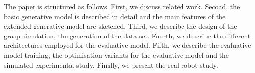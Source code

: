 
The paper is structured as follows. First, we discuss related work. Second, the basic generative model is described in detail and the main features of the extended generative model are sketched. Third, we describe the design of the grasp simulation, the generation of the data set. Fourth, we describe the different architectures employed for the evaluative model. Fifth, we describe the evaluative model training, the optimisation variants for the evaluative model and the simulated experimental study. Finally, we present the real robot study.
